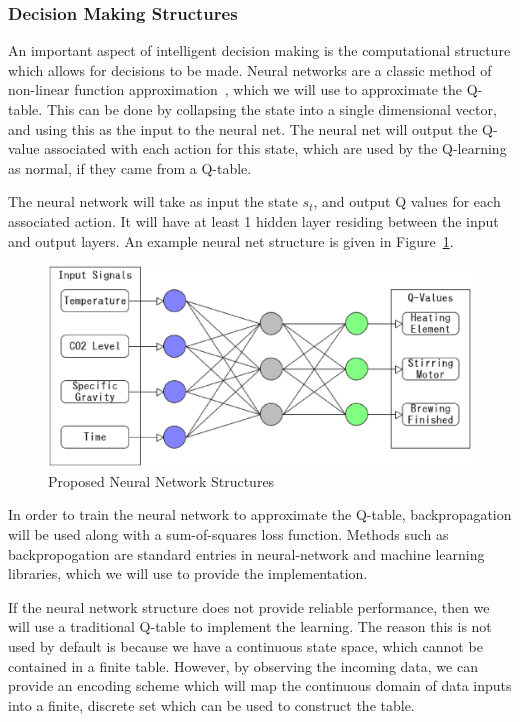 \documentclass[draftclsnofoot,onecolumn,letterpaper,10pt]{IEEEtran}
\begin{document}
\subsubsection{Decision Making Structures}
An important aspect of intelligent decision making is the computational structure which allows for decisions to be made.
Neural networks are a classic method of non-linear function approximation~\cite{RussellNorvig},  which we will use to approximate the Q-table.
This can be done by collapsing the state into a single dimensional vector, and using this as the input to the neural net.
The neural net will output the Q-value associated with each action for this state, which are used by the Q-learning as normal, if they came from a Q-table.

The neural network will take as input the state $s_t$, and output Q values for each associated action.
It will have at least 1 hidden layer residing between the input and output layers.
An example neural net structure is given in Figure~\ref{fig:nn}.

\begin{figure}[h]
\begin{center}
	\caption{Proposed Neural Network Structures \label{fig:nn}}
	\includegraphics[width=\linewidth]{nn.eps}
\end{center}
\end{figure}

In order to train the neural network to approximate the Q-table, backpropagation will be used along with a sum-of-squares loss function.
Methods such as backpropogation are standard entries in neural-network and machine learning libraries, which we will use to provide the implementation.

If the neural network structure does not provide reliable performance, then we will use a traditional Q-table to implement the learning.
The reason this is not used by default is because we have a continuous state space, which cannot be contained in a finite table.
However, by observing the incoming data, we can provide an encoding scheme which will map the continuous domain of data inputs into a finite, discrete set which can be used to construct the table.
\end{document}
